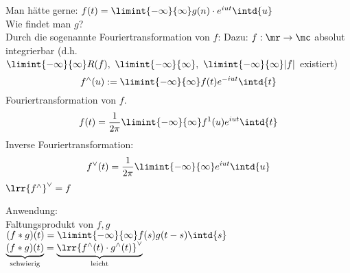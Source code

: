 	Man hätte gerne: $f(t)=\limint{-\infty}{\infty}g(n)\cdot e^{iut}\intd{u}$\\
	Wie findet man $g$?\\
	Durch die sogenannte Fouriertransformation von $f$:
	Dazu: $f:\mr\rightarrow\mc$ absolut integrierbar
	(d.h. $\limint{-\infty}{\infty}R(f),\ \limint{-\infty}{\infty},\ \limint{-\infty}{\infty}|f|$ existiert)
	\[f^{\land}(u):=\limint{-\infty}{\infty}f(t)e^{-iut}\intd{t}\]
	Fouriertransformation von $f$.
	\[f(t)=\dfrac{1}{2\pi}\limint{-\infty}{\infty}f^1(u)e^{iut}\intd{t}\]
	Inverse Fouriertransformation:
	\[f^{\lor}(t)=\dfrac{1}{2\pi}\limint{-\infty}{\infty}e^{iut}\intd{u}\]
	$ \lrr{f^\land}^\lor=f $
	
	Anwendung:\\
	Faltungsprodukt von $f,g$\\
	$ (f*g)(t)=\limint{-\infty}{\infty}f(s)g(t-s)\intd{s} $\\
	$ \underbrace{(f*g)(t)}_{\mbox{\scriptsize schwierig}}=\underbrace{\lrr{f^\land(t)\cdot g^\land(t)}^\lor}_{\mbox{\scriptsize leicht}} $
